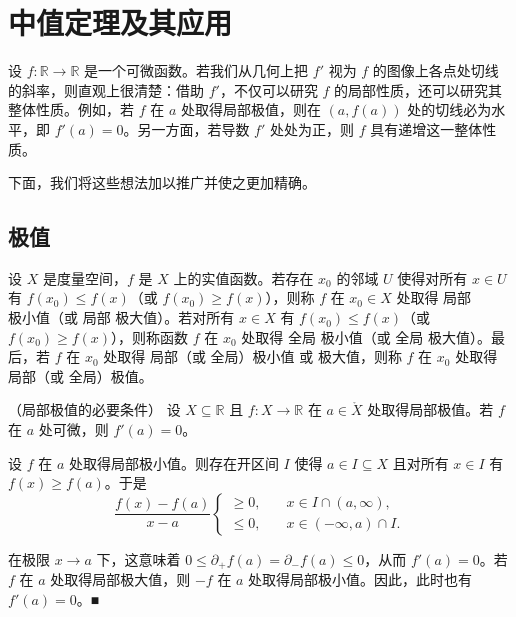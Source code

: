 \section{中值定理及其应用}

设 $ f: \mathbb{R} \to \mathbb{R} $ 是一个可微函数。若我们从几何上把 $ f' $ 视为 $ f $ 的图像上各点处切线的斜率，则直观上很清楚：借助 $ f' $，不仅可以研究 $ f $ 的局部性质，还可以研究其整体性质。例如，若 $ f $ 在 $ a $ 处取得局部极值，则在 $ (a, f(a)) $ 处的切线必为水平，即 $ f'(a) = 0 $。另一方面，若导数 $ f' $ 处处为正，则 $ f $ 具有递增这一整体性质。


下面，我们将这些想法加以推广并使之更加精确。

\subsection*{极值}

设 $X$ 是度量空间，$f$ 是 $X$ 上的实值函数。若存在 $x_0$ 的邻域 $U$ 使得对所有 $x \in U$ 有 $f(x_0) \leq f(x)$（或 $f(x_0) \geq f(x)$），则称 $f$ 在 $x_0 \in X$ 处取得 $\text{局部}$ $\text{极小值}$（或 $\text{局部}$ $\text{极大值}$）。若对所有 $x \in X$ 有 $f(x_0) \leq f(x)$（或 $f(x_0) \geq f(x)$），则称函数 $f$ 在 $x_0$ 处取得 $\text{全局}$ $\text{极小值}$（或 $\text{全局}$ $\text{极大值}$）。最后，若 $f$ 在 $x_0$ 处取得 $\text{局部}$（或 $\text{全局}$）$\text{极小值}$ 或 $\text{极大值}$，则称 $f$ 在 $x_0$ 处取得 $\text{局部}$（或 $\text{全局}$）$\text{极值}$。

\begin{theorem}

（局部极值的必要条件） 设 $ X \subseteq \mathbb{R} $ 且 $ f: X \to \mathbb{R} $ 在 $ a \in \mathring{X} $ 处取得局部极值。若 $ f $ 在 $ a $ 处可微，则 $ f'(a) = 0 $。

\proofhead
设 $f$ 在 $a$ 处取得局部极小值。则存在开区间 $I$ 使得 $a \in I \subseteq X$ 且对所有 $x \in I$ 有 $f(x) \geq f(a)$。于是
\begin{equation}
\frac{f(x)-f(a)}{x-a}\left\{\begin{array}{ll}\geq0,\quad&x\in I\cap(a,\infty),\\ \leq0,\quad&x\in(-\infty,a)\cap I.\end{array}\right.
\end{equation}

在极限 $ x \to a $ 下，这意味着 $ 0 \leq \partial_+ f(a) = \partial_- f(a) \leq 0 $，从而 $ f'(a) = 0 $。若 $ f $ 在 $ a $ 处取得局部极大值，则 $ -f $ 在 $ a $ 处取得局部极小值。因此，此时也有 $ f'(a) = 0 $。■

\end{theorem}

